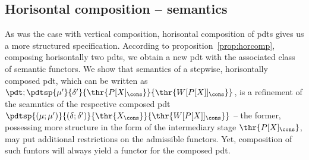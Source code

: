 \subsection{Horisontal composition -- semantics}
As was the case with vertical composition, horisontal composition of pdts
gives us a more structured specification. 
According to
proposition~\ref{prop:horcomp}, composing horisontally two pdts, we obtain a
new pdt with the associated class of semantic functors. 
We show that semantics of a stepwise, horisontally
composed pdt, which can be written as
$\pdt;\pdtsp{\mu'}{\delta'}{\thr{P[X]_\cons}}{\thr{W[P[X]]_\cons}}$, is a
refinement of the seamntics of the respective composed pdt 
$\pdtsp{(\mu;\mu')}{(\delta;\delta')}{\thr{X_\cons}}{\thr{W[P[X]]_\cons}}$ --
the former, possessing more structure in the form of the intermediary stage
$\thr{P[X]_\cons}$, may put additional restrictions on the admissible
functors. Yet, composition of such funtors will always yield a functor for
the composed pdt.

